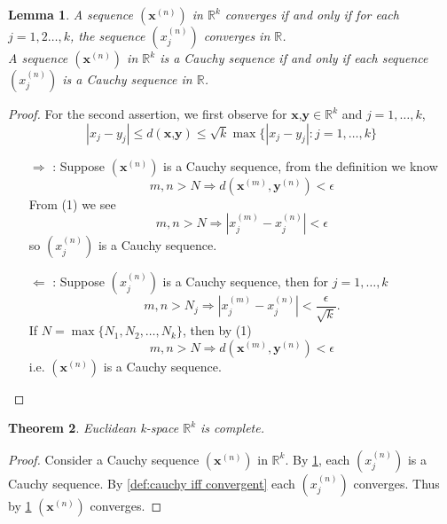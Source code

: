 \documentclass[12pt, lettersize]{book}
\newtheorem{thm}{Theorem}[section]
\newtheorem{lem}[thm]{Lemma}
\begin{document}
	\setcounter{equation}{0}
	\begin{lem}\label{def:sequence in R^k}
		A sequence $(\textbf{x}^{(n)})$ in $\mathbb{R}^k$ converges if and only if for each $j=1,2\dots,k$, the sequence
		$(x_j^{(n)})$ converges in $\mathbb{R}$.\\
		A sequence $(\textbf{x}^{(n)})$ in $\mathbb{R}^k$ is a Cauchy sequence if and only if each sequence $(x_j^{(n)})$
		is a Cauchy sequence in $\mathbb{R}$.
	\end{lem}
	\begin{proof}
		For the second assertion, we first observe for $\textbf{x,y}\in\mathbb{R}^k$ and $j=1,\dots,k$,
		\begin{equation}
			|x_j-y_j|\leq d(\textbf{x,y})\leq \sqrt{k}\max\{|x_j-y_j|: j=1,\dots,k\}
		\end{equation}
		\begin{itemize}
			\item[$\Rightarrow$]: Suppose $(\textbf{x}^{(n)})$ is a Cauchy sequence, from the definition we know
			\begin{displaymath}
				m,n>N\Rightarrow d(\textbf{x}^{(m)},\textbf{y}^{(n)})<\epsilon
			\end{displaymath}
			From (1) we see
			\begin{displaymath}
				m,n>N\Rightarrow|x_j^{(m)}-x_j^{(n)}|<\epsilon
			\end{displaymath}
			so $(x_j^{(n)})$ is a Cauchy sequence.
			\item[$\Leftarrow$]:  Suppose $(x_j^{(n)})$ is a Cauchy sequence, then for $j=1,\dots,k$
			\begin{displaymath}
				m,n>N_j\Rightarrow|x_j^{(m)}-x_j^{(n)}|<\frac{\epsilon}{\sqrt{k}}.
			\end{displaymath}
			If $N=\max\{N_1,N_2,\dots,N_k\}$, then by (1)
			\begin{displaymath}
				m,n>N\Rightarrow d(\textbf{x}^{(m)},\textbf{y}^{(n)})<\epsilon
			\end{displaymath}
			i.e. $(\textbf{x}^{(n)})$ is a Cauchy sequence.
		\end{itemize}
	\end{proof}
	
	\begin{thm}
		Euclidean k-space $\mathbb{R}^k$ is complete.
	\end{thm}
	\begin{proof}
		Consider a Cauchy sequence $(\textbf{x}^{(n)})$ in $\mathbb{R}^k$. By \ref{def:sequence in R^k}, each $(x_j^{(n)})$ is a Cauchy sequence. By \ref{def:cauchy iff convergent} each $(x_j^{(n)})$ converges. Thus by \ref{def:sequence in R^k} $(\textbf{x}^{(n)})$ converges.
	\end{proof}
	
\end{document}
